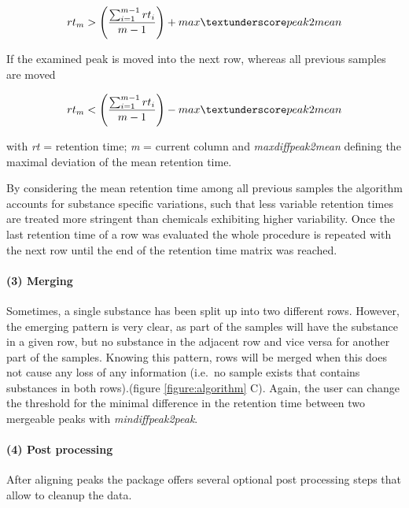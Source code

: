 \begin{equation}
rt_{m} > \left(\frac{\sum_{i=1}^{m-1}rt_{i}}{m-1}\right) + max\textunderscore peak2mean
\end{equation}

If the examined peak is moved into the next row, whereas all previous
samples are moved \par

\begin{equation}
rt_{m} < \left(\frac{\sum_{i=1}^{m-1}rt_{i}}{m-1}\right) - max\textunderscore peak2mean
\end{equation}

with \textit{rt} = retention time; \textit{m} = current column and
\textit{max\textunderscore diff\textunderscore peak2mean} defining the
maximal deviation of the mean retention time.

By considering the mean retention time among all previous samples the
algorithm accounts for substance specific variations, such that less
variable retention times are treated more stringent than chemicals
exhibiting higher variability. Once the last retention time of a row was
evaluated the whole procedure is repeated with the next row until the
end of the retention time matrix was reached.

\paragraph{(3) Merging}\label{merging}

Sometimes, a single substance has been split up into two different rows.
However, the emerging pattern is very clear, as part of the samples will
have the substance in a given row, but no substance in the adjacent row
and vice versa for another part of the samples. Knowing this pattern,
rows will be merged when this does not cause any loss of any information
(i.e.~no sample exists that contains substances in both rows).(figure
\ref{figure:algorithm} C). Again, the user can change the threshold for
the minimal difference in the retention time between two mergeable peaks
with \textit{min\textunderscore diff\textunderscore peak2peak}. \par 

\paragraph{(4) Post processing}\label{post-processing}

After aligning peaks the package offers several optional post processing
steps that allow to cleanup the data.

